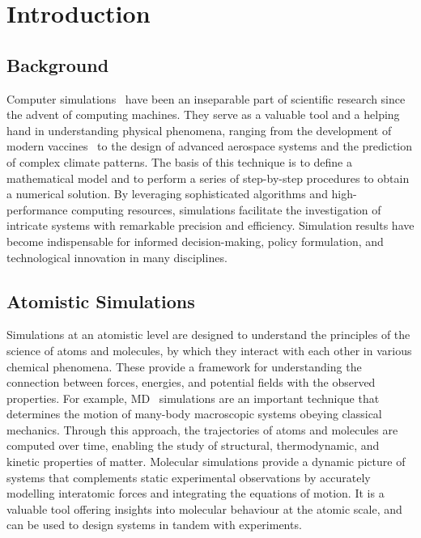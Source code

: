 \chapter{Introduction} %
\label{Chapter1}

\section{Background}
Computer simulations~\cite{compsim} have been an inseparable part of scientific research since the advent of computing machines. They serve as a valuable tool and a helping hand in understanding physical phenomena, ranging from the development of modern vaccines~\cite{hollingsworth2018molecular} to the design of advanced aerospace systems and the prediction of complex climate patterns. The basis of this technique is to define a mathematical model and to perform a series of step-by-step procedures to obtain a numerical solution. By leveraging sophisticated algorithms and high-performance computing resources, simulations facilitate the investigation of intricate systems with remarkable precision and efficiency. Simulation results have become indispensable for informed decision-making, policy formulation, and technological innovation in many disciplines.

\section{Atomistic Simulations}
Simulations at an atomistic level are designed to understand the principles of the science of atoms and molecules, by which they interact with each other in various chemical phenomena. These provide a framework for understanding the connection between forces, energies, and potential fields with the observed properties. For example, \ac{MD}~\cite{MDsim} simulations are an important technique that determines the motion of many-body macroscopic systems obeying classical mechanics.  Through this approach, the trajectories of atoms and molecules are computed over time, enabling the study of structural, thermodynamic, and kinetic properties of matter. Molecular simulations provide a dynamic picture of systems that complements static experimental observations by accurately modelling interatomic forces and integrating the equations of motion. It is a valuable tool offering insights into molecular behaviour at the atomic scale, and can be used to design systems in tandem with experiments. 

